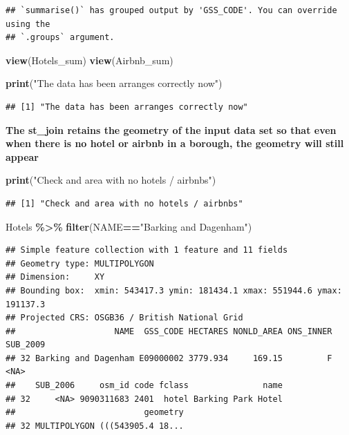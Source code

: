 \documentclass[
]{article}
\newenvironment{Shaded}{\begin{snugshade}}{\end{snugshade}}
\newcommand{\FunctionTok}[1]{\textcolor[rgb]{0.13,0.29,0.53}{\textbf{#1}}}
\newcommand{\NormalTok}[1]{#1}
\newcommand{\SpecialCharTok}[1]{\textcolor[rgb]{0.81,0.36,0.00}{\textbf{#1}}}
\newcommand{\StringTok}[1]{\textcolor[rgb]{0.31,0.60,0.02}{#1}}
\begin{document}
\begin{verbatim}
## `summarise()` has grouped output by 'GSS_CODE'. You can override using the
## `.groups` argument.
\end{verbatim}

\begin{Shaded}
\begin{Highlighting}[]
\FunctionTok{view}\NormalTok{(Hotels\_sum)}
\FunctionTok{view}\NormalTok{(Airbnb\_sum)}

\FunctionTok{print}\NormalTok{(}\StringTok{"The data has been arranges correctly now"}\NormalTok{)}
\end{Highlighting}
\end{Shaded}

\begin{verbatim}
## [1] "The data has been arranges correctly now"
\end{verbatim}

\textbf{The st\_join retains the geometry of the input data set so that
even when there is no hotel or airbnb in a borough, the geometry will
still appear}

\begin{Shaded}
\begin{Highlighting}[]
\FunctionTok{print}\NormalTok{(}\StringTok{"Check and area with no hotels / airbnbs"}\NormalTok{)}
\end{Highlighting}
\end{Shaded}

\begin{verbatim}
## [1] "Check and area with no hotels / airbnbs"
\end{verbatim}

\begin{Shaded}
\begin{Highlighting}[]
\NormalTok{Hotels }\SpecialCharTok{\%\textgreater{}\%}
  \FunctionTok{filter}\NormalTok{(NAME}\SpecialCharTok{==}\StringTok{"Barking and Dagenham"}\NormalTok{)}
\end{Highlighting}
\end{Shaded}

\begin{verbatim}
## Simple feature collection with 1 feature and 11 fields
## Geometry type: MULTIPOLYGON
## Dimension:     XY
## Bounding box:  xmin: 543417.3 ymin: 181434.1 xmax: 551944.6 ymax: 191137.3
## Projected CRS: OSGB36 / British National Grid
##                    NAME  GSS_CODE HECTARES NONLD_AREA ONS_INNER SUB_2009
## 32 Barking and Dagenham E09000002 3779.934     169.15         F     <NA>
##    SUB_2006     osm_id code fclass               name
## 32     <NA> 9090311683 2401  hotel Barking Park Hotel
##                          geometry
## 32 MULTIPOLYGON (((543905.4 18...
\end{verbatim}
\end{document}
